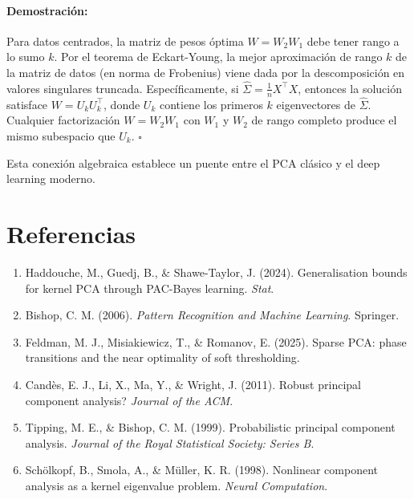 \documentclass[11pt]{article}
\theoremstyle{plain}
\newenvironment{proof}{\paragraph{Demostración:}}{\hfill$\square$}
\begin{document}
\begin{proof}
Para datos centrados, la matriz de pesos óptima $W = W_2 W_1$ debe tener rango a lo sumo $k$. Por el teorema de Eckart-Young, la mejor aproximación de rango $k$ de la matriz de datos (en norma de Frobenius) viene dada por la descomposición en valores singulares truncada. Específicamente, si $\hat{\Sigma} = \frac{1}{n}X^\top X$, entonces la solución satisface $W = U_k U_k^\top$, donde $U_k$ contiene los primeros $k$ eigenvectores de $\hat{\Sigma}$. Cualquier factorización $W = W_2 W_1$ con $W_1$ y $W_2$ de rango completo produce el mismo subespacio que $U_k$.
\end{proof}

Esta conexión algebraica establece un puente entre el PCA clásico y el deep learning moderno.


\section*{Referencias}

\begin{enumerate}
    \item Haddouche, M., Guedj, B., \& Shawe-Taylor, J. (2024). Generalisation bounds for kernel PCA through PAC-Bayes learning. \textit{Stat}.
    
    \item Bishop, C. M. (2006). \textit{Pattern Recognition and Machine Learning}. Springer.
    
    \item Feldman, M. J., Misiakiewicz, T., \& Romanov, E. (2025). Sparse PCA: phase transitions and the near optimality of soft thresholding.
    
    \item Candès, E. J., Li, X., Ma, Y., \& Wright, J. (2011). Robust principal component analysis? \textit{Journal of the ACM}.
    
    \item Tipping, M. E., \& Bishop, C. M. (1999). Probabilistic principal component analysis. \textit{Journal of the Royal Statistical Society: Series B}.
    
    \item Schölkopf, B., Smola, A., \& Müller, K. R. (1998). Nonlinear component analysis as a kernel eigenvalue problem. \textit{Neural Computation}.
\end{enumerate}
\end{document}

